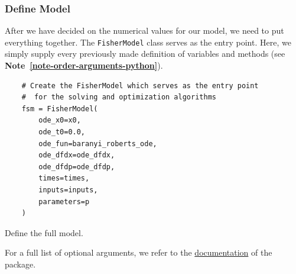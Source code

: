 \documentclass[graybox]{svmult}
\begin{document}
\subsubsection{Define Model}
After we have decided on the numerical values for our model, we need to put everything together.
The \texttt{FisherModel} class serves as the entry point.
Here, we simply supply every previously made definition of variables and methods (see \textbf{Note~\ref{note-order-arguments-python}}).
\begin{code}[H]
    \begin{verbatim}
    # Create the FisherModel which serves as the entry point
    #  for the solving and optimization algorithms
    fsm = FisherModel(
        ode_x0=x0,
        ode_t0=0.0,
        ode_fun=baranyi_roberts_ode,
        ode_dfdx=ode_dfdx,
        ode_dfdp=ode_dfdp,
        times=times,
        inputs=inputs,
        parameters=p
    )
    \end{verbatim}
    \caption{Define the full model.}
    \label{code:model_definition}
\end{code}
\noindent For a full list of optional arguments, we refer to the \href{https://spatial-systems-biology-freiburg.github.io/eDPM/}{documentation} of the package.
%
%
\end{document}
